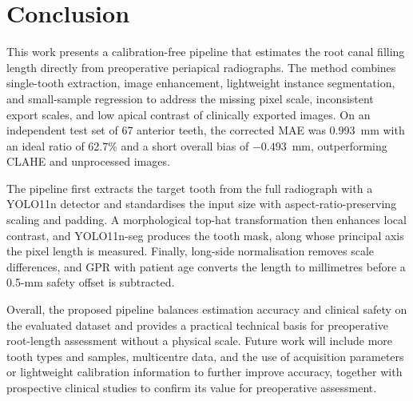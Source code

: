 \section{Conclusion}

This work presents a calibration-free pipeline that estimates the root canal filling length directly from preoperative periapical radiographs. The method combines single-tooth extraction, image enhancement, lightweight instance segmentation, and small-sample regression to address the missing pixel scale, inconsistent export scales, and low apical contrast of clinically exported images. On an independent test set of 67 anterior teeth, the corrected MAE was 0.993~mm with an ideal ratio of 62.7\% and a short overall bias of $-0.493$~mm, outperforming CLAHE and unprocessed images.

The pipeline first extracts the target tooth from the full radiograph with a YOLO11n detector and standardises the input size with aspect-ratio-preserving scaling and padding. A morphological top-hat transformation then enhances local contrast, and YOLO11n-seg produces the tooth mask, along whose principal axis the pixel length is measured. Finally, long-side normalisation removes scale differences, and GPR with patient age converts the length to millimetres before a 0.5-mm safety offset is subtracted.

Overall, the proposed pipeline balances estimation accuracy and clinical safety on the evaluated dataset and provides a practical technical basis for preoperative root-length assessment without a physical scale. Future work will include more tooth types and samples, multicentre data, and the use of acquisition parameters or lightweight calibration information to further improve accuracy, together with prospective clinical studies to confirm its value for preoperative assessment.
